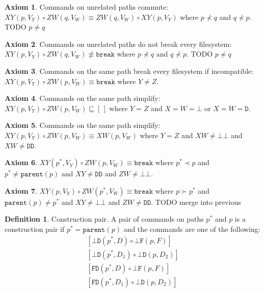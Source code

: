 \documentclass[12pt]{article}
\newcommand{\empt}{\bot}
\newcommand{\parent}{\mathtt{parent}}
\newcommand{\pp}{p^*} %
\newcommand{\cbrk}{\mathtt{break}}
\newcommand{\fscommand}[2]{{#1#2}}
\newcommand{\fsregcommandchar}[1]{\mathtt{#1}}
\newcommand{\fsregcommand}[2]{\fscommand{\fsregcommandchar{#1}}{\fsregcommandchar{#2}}}
\newcommand{\cbb}{\fsregcommand{\empt}{\empt}}
\newcommand{\cbf}{\fsregcommand{\empt}{F}}
\newcommand{\cbd}{\fsregcommand{\empt}{D}}
\newcommand{\cfd}{\fsregcommand{F}{D}}
\newcommand{\cdd}{\fsregcommand{D}{D}}
\newcommand{\cxy}{\fscommand{X}{Y}}
\newcommand{\cxw}{\fscommand{X}{W}}
\newcommand{\czw}{\fscommand{Z}{W}}
\newcommand{\cc}{\circ}
\newcommand{\descendant}{\prec}
\newcommand{\ancestor}{\succ}
\newcommand{\eqext}{\sqsubseteq}
\newcommand{\nequiv}{\not\equiv}
\newcommand{\emptyseq}{[\,]} %
\theoremstyle{definition}
\newtheorem{mydef}{Definition}
\newtheorem{myax}{Axiom}
\begin{document}
\begin{myax}\label{ax_separate_commute}
Commands on unrelated paths commute:
$\cxy(p,V_Y)\cc  \czw(q,V_W) \equiv \czw(q,V_W)\cc  \cxy(p,V_Y)$ where $p\not\descendant q$ and $q\not\descendant p$.
TODO $p\neq q$
\end{myax}

\begin{myax}\label{ax_separate_nobreaks}
Commands on unrelated paths do not break every filesystem:
$\cxy(p,V_Y)\cc  \czw(q,V_W) \nequiv \cbrk$ where $p\not\descendant q$ and $q\not\descendant p$.
TODO $p\neq q$
\end{myax}


\begin{myax}\label{ax_same_breaks}
Commands on the same path break every filesystem if incompatible:
$\cxy(p,V_Y)\cc  \czw(p,V_W) \equiv \cbrk$ where $Y\ne Z$.
\end{myax}

\begin{myax}\label{ax_same_emptyseq}
Commands on the same path simplify:
$\cxy(p,V_Y)\cc  \czw(p,V_W) \eqext \emptyseq$ where $Y=Z$ and $X=W=\fsregcommandchar{\empt}$ or $X=W=\fsregcommandchar{D}$.
\end{myax}

\begin{myax}\label{ax_same_singlec}
Commands on the same path simplify:
$\cxy(p,V_Y)\cc  \czw(p,V_W) \equiv \cxw(p,V_W)$ where $Y=Z$ and $XW\neq\cbb$ and $XW\neq\cdd$.
\end{myax}

\begin{myax}\label{ax_distantchild_breaks}
$\cxy(\pp,V_Y)\cc  \czw(p,V_W) \equiv \cbrk$ where $\pp\descendant p$ and $\pp\neq\parent(p)$ and $\cxy\neq\cdd$ and $\czw\neq\cbb$.
\end{myax}

\begin{myax}\label{ax_distantparent_breaks}
$\cxy(p,V_Y)\cc  \czw(\pp,V_W) \equiv \cbrk$ where $p\ancestor \pp$ and $\parent(p)\neq \pp$ and $\cxy\neq\cbb$ and $\czw\neq\cdd$.
TODO merge into previous
\end{myax}

\begin{mydef}{Construction pair.}
A pair of commands on paths $\pp$ and $p$ is a construction pair if $\pp=\parent(p)$ and the commands are one
of the following:
   \begin{gather*}
            [\cbd(\pp, D)\cc  \cbf(p, F)] \\
            [\cbd(\pp, D_1)\cc  \cbd(p, D_2)] \\
            [\cfd(\pp, D)\cc  \cbf(p, F)] \\
            [\cfd(\pp, D_1)\cc  \cbd(p, D_2)]
   \end{gather*}
\end{mydef}
\end{document}
